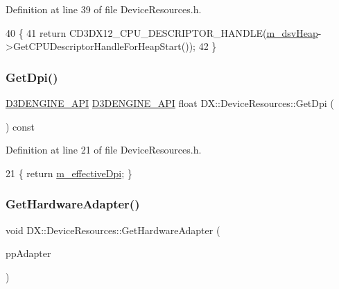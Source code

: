 Definition at line 39 of file Device\+Resources.\+h.


\begin{DoxyCode}
40         \{
41             \textcolor{keywordflow}{return} CD3DX12\_CPU\_DESCRIPTOR\_HANDLE(\mbox{\hyperlink{class_d_x_1_1_device_resources_a71a459331defc54ff1677609d8608997}{m\_dsvHeap}}->GetCPUDescriptorHandleForHeapStart());
42         \}
\end{DoxyCode}
\mbox{\label{class_d_x_1_1_device_resources_a3f921a0e44f6216b90114ba81305baf6}} 
\subsubsection{\texorpdfstring{Get\+Dpi()}{GetDpi()}}
{\footnotesize\ttfamily \mbox{\hyperlink{stdafx_8h_a8ee2d990c5dfba7794dd2b60741d7722}{D3\+D\+E\+N\+G\+I\+N\+E\+\_\+\+A\+PI}} \mbox{\hyperlink{stdafx_8h_a8ee2d990c5dfba7794dd2b60741d7722}{D3\+D\+E\+N\+G\+I\+N\+E\+\_\+\+A\+PI}} float D\+X\+::\+Device\+Resources\+::\+Get\+Dpi (\begin{DoxyParamCaption}{ }\end{DoxyParamCaption}) const\hspace{0.3cm}{\ttfamily [inline]}}



Definition at line 21 of file Device\+Resources.\+h.


\begin{DoxyCode}
21 \{ \textcolor{keywordflow}{return} \mbox{\hyperlink{class_d_x_1_1_device_resources_a0999b5522ac0a401e92b18db8f12a663}{m\_effectiveDpi}}; \}
\end{DoxyCode}
\mbox{\label{class_d_x_1_1_device_resources_a9d990146724d7f465b277c95675459bd}} 
\subsubsection{\texorpdfstring{Get\+Hardware\+Adapter()}{GetHardwareAdapter()}}
{\footnotesize\ttfamily void D\+X\+::\+Device\+Resources\+::\+Get\+Hardware\+Adapter (\begin{DoxyParamCaption}\item[{I\+D\+X\+G\+I\+Adapter1 $\ast$$\ast$}]{pp\+Adapter }\end{DoxyParamCaption})\hspace{0.3cm}{\ttfamily [private]}}



